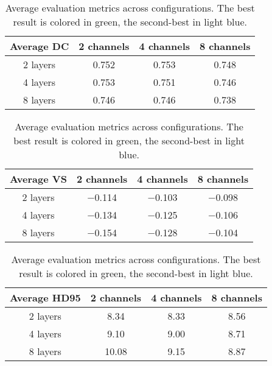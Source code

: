 \begin{table}[htbp]
    \centering
    \begin{tabular}{c|c|c|c}
        \toprule
        \textbf{Average DC} & \num{2} channels & \num{4} channels & \num{8} channels \\
        \midrule
        \num{2} layers & \num{0.752} & \cellcolor{green!20}\num{0.753} & \num{0.748} \\
        \num{4} layers & \cellcolor{cyan!20}\num{0.753} & \num{0.751} & \num{0.746} \\
        \num{8} layers & \num{0.746} & \num{0.746} & \num{0.738} \\
        \bottomrule
    \end{tabular}

    \vspace{10pt}
    \begin{tabular}{c|c|c|c}
        \toprule
        \textbf{Average VS} & \num{2} channels & \num{4} channels & \num{8} channels \\
        \midrule
        \num{2} layers & \num{-0.114} & \cellcolor{cyan!20}\num{-0.103} & \cellcolor{green!20}\num{-0.098} \\
        \num{4} layers & \num{-0.134} & \num{-0.125} & \num{-0.106} \\
        \num{8} layers & \num{-0.154} & \num{-0.128} & \num{-0.104} \\
        \bottomrule
    \end{tabular}

    \vspace{10pt}
    \begin{tabular}{c|c|c|c}
        \toprule
        \textbf{Average HD95} & \num{2} channels & \num{4} channels & \num{8} channels \\
        \midrule
        \num{2} layers & \num{8.34} & \cellcolor{green!20}\num{8.33} & \cellcolor{cyan!20}\num{8.56} \\
        \num{4} layers & \num{9.10} & \num{9.00} & \num{8.71} \\
        \num{8} layers & \num{10.08} & \num{9.15} & \num{8.87} \\
        \bottomrule
    \end{tabular}
    \caption{Average evaluation metrics across configurations. The best result is colored in green, the second-best in light blue.}
\end{table}
